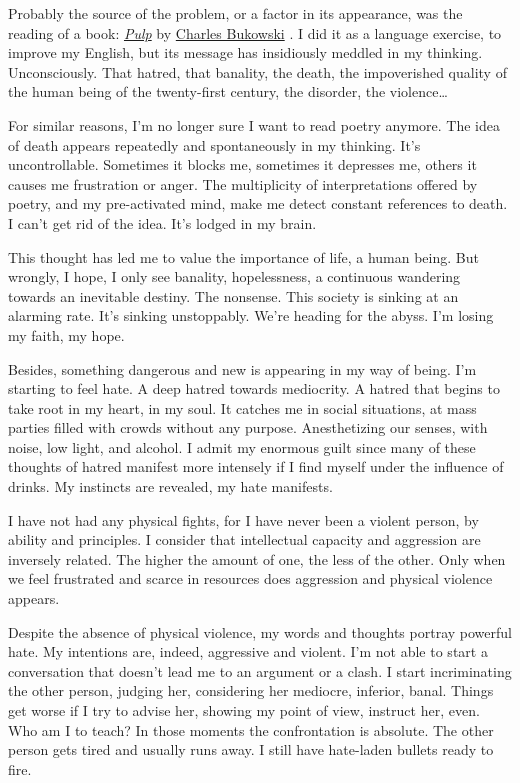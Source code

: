 \documentclass[]{book}
\begin{document}
Probably the source of the problem, or a factor in its appearance, was the reading of a book: \href{https://en.wikipedia.org/wiki/Pulp_(novel)}{\emph{Pulp}} by \href{https://en.wikipedia.org/wiki/Charles_Bukowski}{Charles Bukowski} \citep{bukowski2002pulp}. I did it as a language exercise, to improve my English, but its message has insidiously meddled in my thinking. Unconsciously. That hatred, that banality, the death, the impoverished quality of the human being of the twenty-first century, the disorder, the violence\ldots{}

For similar reasons, I'm no longer sure I want to read poetry anymore. The idea of death appears repeatedly and spontaneously in my thinking. It's uncontrollable. Sometimes it blocks me, sometimes it depresses me, others it causes me frustration or anger. The multiplicity of interpretations offered by poetry, and my pre-activated mind, make me detect constant references to death. I can't get rid of the idea. It's lodged in my brain.

This thought has led me to value the importance of life, a human being. But wrongly, I hope, I only see banality, hopelessness, a continuous wandering towards an inevitable destiny. The nonsense. This society is sinking at an alarming rate. It's sinking unstoppably. We're heading for the abyss. I'm losing my faith, my hope.

Besides, something dangerous and new is appearing in my way of being. I'm starting to feel hate. A deep hatred towards mediocrity. A hatred that begins to take root in my heart, in my soul. It catches me in social situations, at mass parties filled with crowds without any purpose. Anesthetizing our senses, with noise, low light, and alcohol. I admit my enormous guilt since many of these thoughts of hatred manifest more intensely if I find myself under the influence of drinks. My instincts are revealed, my hate manifests.

I have not had any physical fights, for I have never been a violent person, by ability and principles. I consider that intellectual capacity and aggression are inversely related. The higher the amount of one, the less of the other. Only when we feel frustrated and scarce in resources does aggression and physical violence appears.

Despite the absence of physical violence, my words and thoughts portray powerful hate. My intentions are, indeed, aggressive and violent. I'm not able to start a conversation that doesn't lead me to an argument or a clash. I start incriminating the other person, judging her, considering her mediocre, inferior, banal. Things get worse if I try to advise her, showing my point of view, instruct her, even. Who am I to teach? In those moments the confrontation is absolute. The other person gets tired and usually runs away. I still have hate-laden bullets ready to fire.
\end{document}
